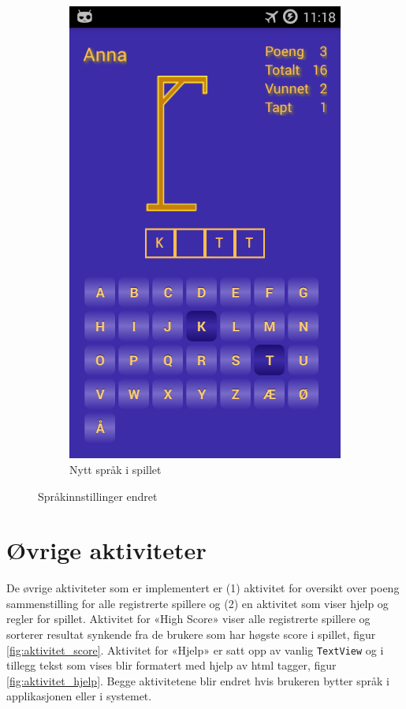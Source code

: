 \begin{figure}[ht]
\begin{subfigure}[b]{0.25\textwidth}
        \includegraphics[width=\textwidth]{./img/bruksanvisning/11.png}
        \caption{Nytt språk i spillet}
        \label{fig:spill_norsk}
    \end{subfigure}
    \caption{Språkinnstillinger endret}\label{fig:innstillinger_endret_norsk}
\end{figure}



\section{Øvrige aktiviteter}
De øvrige aktiviteter som er implementert er (1) aktivitet for oversikt over poeng sammenstilling for alle registrerte spillere og (2) en aktivitet som viser hjelp og regler for spillet. Aktivitet for «High Score» viser alle registrerte spillere og sorterer resultat synkende fra de brukere som har høgste score i spillet, figur \ref{fig:aktivitet_score}. Aktivitet for «Hjelp» er satt opp av vanlig \texttt{TextView} og i tillegg tekst som vises blir formatert med hjelp av html tagger, figur \ref{fig:aktivitet_hjelp}. Begge aktivitetene blir endret hvis brukeren bytter språk i applikasjonen eller i systemet. 

